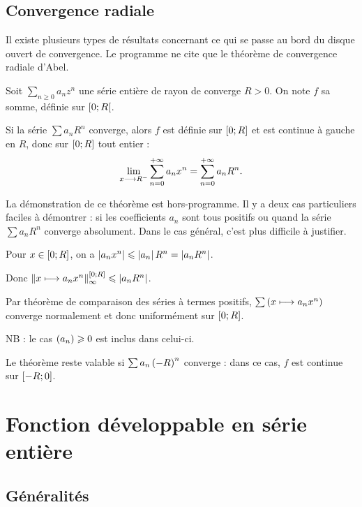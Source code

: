 \subsection{Convergence radiale}

Il existe plusieurs types de résultats concernant ce qui se passe au bord du disque ouvert de convergence. Le programme ne cite que le théorème de convergence radiale d'Abel.

\begin{theo}
Soit \(\sum_{n\geq0}a_nz^n\) une série entière de rayon de converge \(R>0\). On note \(f\) sa somme, définie sur \(\left[0;R\right[\).

Si la série \(\sum a_nR^n\) converge, alors \(f\) est définie sur \(\left[0;R\right]\) et est continue à gauche en \(R\), donc sur \(\left[0;R\right]\) tout entier : \[\lim_{x\longrightarrow R^-}\sum_{n=0}^{+\infty}a_nx^n=\sum_{n=0}^{+\infty}a_nR^n.\]
\end{theo}

La démonstration de ce théorème est hors-programme. Il y a deux cas particuliers faciles à démontrer : si les coefficients \(a_n\) sont tous positifs ou quand la série \(\sum a_nR^n\) converge absolument. Dans le cas général, c'est plus difficile à justifier.

\begin{dem}
Pour \(x\in\left[0;R\right]\), on a \(\left\lvert a_nx^n\right\rvert\leqslant\left\lvert a_n\right\rvert R^n=\left\lvert a_nR^n\right\rvert\).

Donc \(\norme{x\mapsto a_nx^n}_\infty^{\intervii{0}{R}}\leq\abs{a_nR^n}\).

Par théorème de comparaison des séries à termes positifs, \(\sum\left(x\longmapsto a_nx^n\right)\) converge normalement et donc uniformément sur \(\left[0;R\right]\).

NB : le cas \(\left(a_n\right)\geqslant0\) est inclus dans celui-ci.
\end{dem}

\begin{rem}
Le théorème reste valable si \(\sum a_n\left(-R\right)^n\) converge : dans ce cas, \(f\) est continue sur \(\left[-R;0\right]\).
\end{rem}

\section{Fonction développable en série entière}

\subsection{Généralités}

